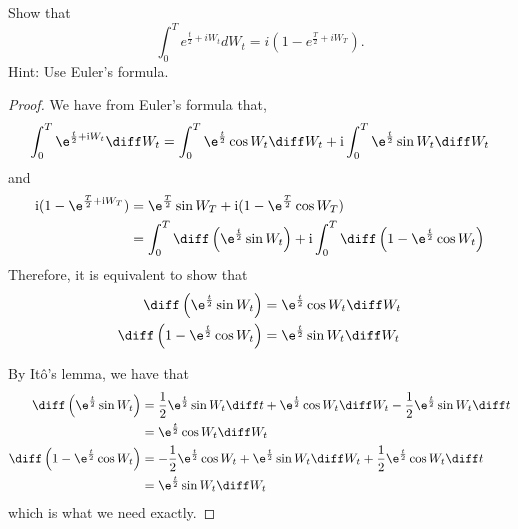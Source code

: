     \problem
    \begin{question}
        Show that
        \[\int_0^Te^{\frac{t}{2}+iW_t}dW_t=i(1-e^{\frac{T}{2}+iW_T}).\]
        Hint: Use Euler's formula.
    \end{question}
    \newcommand{\img}{\mathrm i}
    \begin{proof}
        We have from Euler's formula that,
        \[\begin{aligned}
            \int_0^T\e^{\frac{t}{2}+\img W_t}\diff W_t
            =\int_0^T\e^{\frac{t}{2}}\cos W_t\diff W_t
            +\img\int_0^T\e^{\frac{t}{2}}\sin W_t\diff W_t
        \end{aligned}\]
        and
        \[\begin{aligned}
            \img(1-\e^{\frac{T}{2}+\img W_T})
        &=\e^{\frac{T}{2}}\sin W_T+\img(1-\e^{\frac{T}{2}}\cos W_T)\\
        &=\int_0^T\diff\left(\e^{\frac{t}{2}}\sin W_t\right)
        +\img\int_0^T\diff\left(1-\e^{\frac{t}{2}}\cos W_t\right)
        \end{aligned}\]
        Therefore, it is equivalent to show that
        \[\begin{aligned}
            \diff\left(\e^{\frac{t}{2}}\sin W_t\right)
            &=\e^{\frac{t}{2}}\cos W_t\diff W_t\\
            \diff\left(1-\e^{\frac{t}{2}}\cos W_t\right)
            &=\e^{\frac{t}{2}}\sin W_t\diff W_t
        \end{aligned}\]

        By It\^o's lemma, we have that
        \[\begin{aligned}
            \diff\left(\e^{\frac{t}{2}}\sin W_t\right)
            &=\frac{1}{2}\e^{\frac{t}{2}}\sin W_t\diff t
            +\e^{\frac{t}{2}}\cos W_t\diff W_t
            -\frac{1}{2}\e^{\frac{t}{2}}\sin W_t\diff t\\
            &=\e^{\frac{t}{2}}\cos W_t\diff W_t\\
            \diff\left(1-\e^{\frac{t}{2}}\cos W_t\right)
            &=-\frac{1}{2}\e^{\frac{t}{2}}\cos W_t
            +\e^{\frac{t}{2}}\sin W_t\diff W_t
            +\frac{1}{2}\e^{\frac{t}{2}}\cos W_t\diff t\\
            &=\e^{\frac{t}{2}}\sin W_t\diff W_t
        \end{aligned}\]
        which is what we need exactly.
    \end{proof}

